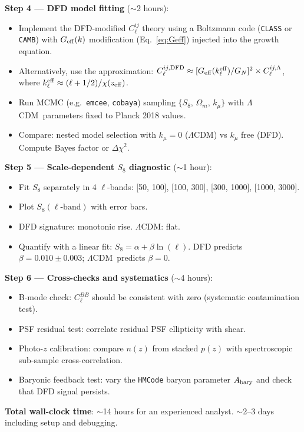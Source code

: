 \documentclass[11pt,a4paper]{article}
\newcommand{\LCDM}{$\Lambda$CDM}
\newcommand{\kmu}{k_\mu}
\newcommand{\Geff}{G_{\rm eff}}
\begin{document}
\begin{pipelinebox}
\textbf{Step 4 --- DFD model fitting} ($\sim$2 hours):
\begin{itemize}[nosep]
\item Implement the DFD-modified $C_\ell^{ij}$ theory using a Boltzmann
  code (\texttt{CLASS} or \texttt{CAMB}) with $\Geff(k)$ modification
  (Eq.~\ref{eq:Geff}) injected into the growth equation.
\item Alternatively, use the approximation:
  $C_\ell^{ij,\rm DFD} \approx [\Geff(k_\ell^{\rm eff})/G_N]^2 \times
  C_\ell^{ij,\Lambda}$, where $k_\ell^{\rm eff} \approx
  (\ell + 1/2)/\chi(z_{\rm eff})$.
\item Run MCMC (e.g.\ \texttt{emcee}, \texttt{cobaya}) sampling
  $\{S_8,\,\Omega_m,\,\kmu\}$ with \LCDM\ parameters fixed to Planck
  2018 values.
\item Compare: nested model selection with $\kmu = 0$ (\LCDM) vs
  $\kmu$ free (DFD). Compute Bayes factor or $\Delta\chi^2$.
\end{itemize}

\textbf{Step 5 --- Scale-dependent $S_8$ diagnostic} ($\sim$1 hour):
\begin{itemize}[nosep]
\item Fit $S_8$ separately in 4 $\ell$-bands: [50, 100], [100, 300],
  [300, 1000], [1000, 3000].
\item Plot $S_8(\ell\text{-band})$ with error bars.
\item DFD signature: monotonic rise. \LCDM: flat.
\item Quantify with a linear fit: $S_8 = \alpha + \beta \ln(\ell)$.
  DFD predicts $\beta = 0.010 \pm 0.003$; \LCDM\ predicts $\beta = 0$.
\end{itemize}

\textbf{Step 6 --- Cross-checks and systematics} ($\sim$4 hours):
\begin{itemize}[nosep]
\item B-mode check: $C_\ell^{BB}$ should be consistent with zero
  (systematic contamination test).
\item PSF residual test: correlate residual PSF ellipticity with shear.
\item Photo-$z$ calibration: compare $n(z)$ from stacked $p(z)$ with
  spectroscopic sub-sample cross-correlation.
\item Baryonic feedback test: vary the \texttt{HMCode} baryon parameter
  $A_{\rm bary}$ and check that DFD signal persists.
\end{itemize}

\textbf{Total wall-clock time}: $\sim$14 hours for an experienced
analyst. $\sim$2--3 days including setup and debugging.

\end{pipelinebox}
\end{document}
